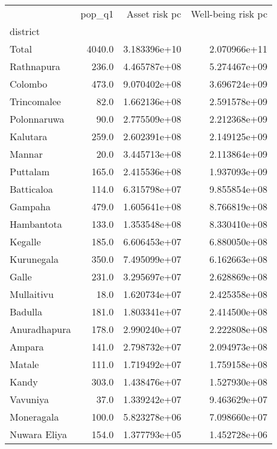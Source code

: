 \begin{tabular}{lrrr}
\toprule
{} &  pop\_q1 &  Asset risk pc &  Well-being risk pc \\
district     &         &                &                     \\
\midrule
Total        &  4040.0 &   3.183396e+10 &        2.070966e+11 \\
Rathnapura   &   236.0 &   4.465787e+08 &        5.274467e+09 \\
Colombo      &   473.0 &   9.070402e+08 &        3.696724e+09 \\
Trincomalee  &    82.0 &   1.662136e+08 &        2.591578e+09 \\
Polonnaruwa  &    90.0 &   2.775509e+08 &        2.212368e+09 \\
Kalutara     &   259.0 &   2.602391e+08 &        2.149125e+09 \\
Mannar       &    20.0 &   3.445713e+08 &        2.113864e+09 \\
Puttalam     &   165.0 &   2.415536e+08 &        1.937093e+09 \\
Batticaloa   &   114.0 &   6.315798e+07 &        9.855854e+08 \\
Gampaha      &   479.0 &   1.605641e+08 &        8.766819e+08 \\
Hambantota   &   133.0 &   1.353548e+08 &        8.330410e+08 \\
Kegalle      &   185.0 &   6.606453e+07 &        6.880050e+08 \\
Kurunegala   &   350.0 &   7.495099e+07 &        6.162663e+08 \\
Galle        &   231.0 &   3.295697e+07 &        2.628869e+08 \\
Mullaitivu   &    18.0 &   1.620734e+07 &        2.425358e+08 \\
Badulla      &   181.0 &   1.803341e+07 &        2.414500e+08 \\
Anuradhapura &   178.0 &   2.990240e+07 &        2.222808e+08 \\
Ampara       &   141.0 &   2.798732e+07 &        2.094973e+08 \\
Matale       &   111.0 &   1.719492e+07 &        1.759158e+08 \\
Kandy        &   303.0 &   1.438476e+07 &        1.527930e+08 \\
Vavuniya     &    37.0 &   1.339242e+07 &        9.463629e+07 \\
Moneragala   &   100.0 &   5.823278e+06 &        7.098660e+07 \\
Nuwara Eliya &   154.0 &   1.377793e+05 &        1.452728e+06 \\
\bottomrule
\end{tabular}
